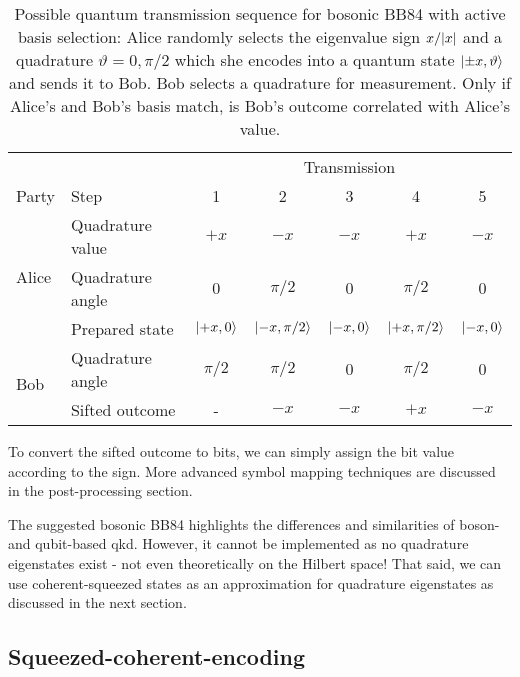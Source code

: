 \begin{table}[htb]
	\centering
	\begin{tabular}{llccccc}
		\toprule
		& & \multicolumn{5}{c}{Transmission} \\
		\cmidrule{3-7}
		Party & Step & 1 & 2 & 3 & 4 & 5 \\ 
		\midrule
		\multirow{3}{*}{Alice} & Quadrature value & $+x$ & $-x$ & $-x$ & $+x$ & $-x$ \\
		& Quadrature angle & $0$ & $\pi/2$ & $0$ & $\pi/2$ & $0$ \\
		& Prepared state & $\ket{+x,0}$ & $\ket{-x,\pi/2}$ & $\ket{-x,0}$ & $\ket{+x,\pi/2}$ & $\ket{-x,0}$ \\
		\cmidrule{1-2}
		\multirow{2}{*}{Bob} & Quadrature angle & $\pi/2$ & $\pi/2$ & $0$ & $\pi/2$ & $0$ \\
		& Sifted outcome & - & $-x$ & $-x$ & $+x$ & $-x$ \\
		\bottomrule
	\end{tabular}
	\caption{Possible quantum transmission sequence for bosonic BB84 with active basis selection: Alice randomly selects the eigenvalue sign $x/\abs{x}$ and a quadrature $\vartheta=0,\pi/2$ which she encodes into a quantum state $\ket{\pm x,\vartheta}$ and sends it to Bob. Bob selects a quadrature for measurement. Only if Alice's and Bob's basis match, is Bob's outcome correlated with Alice's value.}\label{tab:boson_transmission_sequence}
\end{table}
To convert the sifted outcome to bits, we can simply assign the bit value according to the sign.
More advanced symbol mapping techniques are discussed in the post-processing section.

The suggested bosonic BB84 highlights the differences and similarities of boson- and qubit-based \gls{qkd}.
However, it cannot be implemented as no quadrature eigenstates exist - not even theoretically on the Hilbert space!
That said, we can use coherent-squeezed states as an approximation for quadrature eigenstates as discussed in the next section.

\FloatBarrier
\subsection{Squeezed-coherent-encoding}


